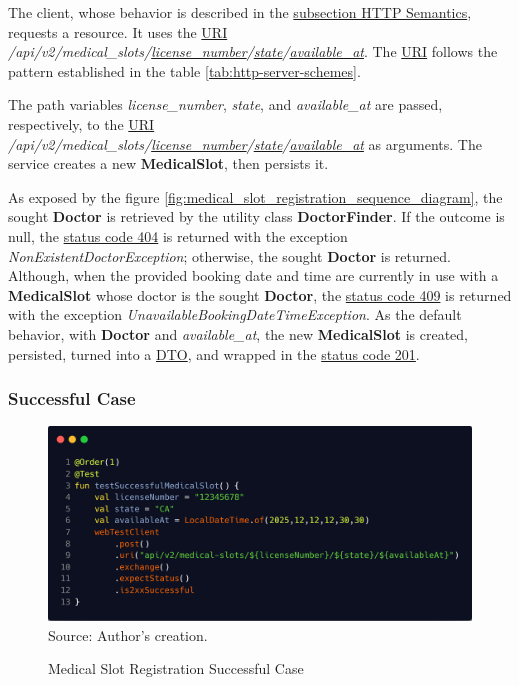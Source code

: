 The client, whose behavior is described in the \hyperref[subsection:http_semantics]{subsection HTTP Semantics}, requests a resource. It uses the \hyperref[appendix:glossary]{URI} \textit{/api/v2/medical\_slots/\underline{license\_number}/\underline{state}/\underline{available\_at}}. The \hyperref[appendix:glossary]{URI} follows the pattern established  in the table \ref{tab:http-server-schemes}.

The path variables \textit{license\_number}, \textit{state}, and \textit{available\_at} are passed, respectively, to the \hyperref[appendix:glossary]{URI} \textit{/api/v2/medical\_slots/\underline{license\_number}/\underline{state}/\underline{available\_at}} as arguments. The service creates a new \textbf{MedicalSlot}, then persists it.

As exposed by the figure \ref{fig:medical_slot_registration_sequence_diagram}, the sought \textbf{Doctor} is retrieved by the utility class \textbf{DoctorFinder}. If the outcome is null, the \hyperref[tab:summary_http_status_codes]{status code 404} is returned  with the exception \textit{NonExistentDoctorException}; otherwise, the sought \textbf{Doctor} is returned. 
Although, when the provided booking date and time are currently in use with a \textbf{MedicalSlot} whose doctor is the sought \textbf{Doctor}, the \hyperref[tab:summary_http_status_codes]{status code 409} is returned with the exception \textit{UnavailableBookingDateTimeException}. As the default behavior, with \textbf{Doctor} and \textit{available\_at}, the new \textbf{MedicalSlot} is created, persisted, turned into a \hyperref[appendix:glossary]{DTO}, and wrapped in the \hyperref[tab:summary_http_status_codes]{status code 201}.

\subsubsection{Successful Case}

\begin{figure}[H]
	\centering
	\caption{Medical Slot Registration Successful Case}
	\includegraphics[width=1\linewidth]{figures/medical_slot_registration_successful_integration_test.png}
	\label{fig:medical_slot_registration_successful_integration_test}
	\footnotesize Source: Author's creation.
\end{figure}

